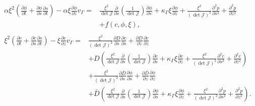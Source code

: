 \begin{subequations}\label{Vnitřní rozvoj: Transformovaná úloha fázového pole}
    \begin{align}
        \begin{split}
            \alpha \xi^2 \left(\frac{\partial \phi}{\partial t} + \frac{\partial \phi}{\partial s}\frac{\partial s}{\partial t}\right) - \alpha\xi \frac{\partial \phi}{\partial z}v_\Gamma =& \frac{\xi^2}{\det \mathcal{J}} \frac{\partial}{\partial s} \left(\frac{1}{\det \mathcal{J}}\right) \frac{\partial \phi}{\partial s} + \kappa_\Gamma\xi \frac{\partial \phi}{\partial z} + \frac{\xi^2}{\left(\det \mathcal{J}\right)^2}\frac{\partial^2 p}{\partial s^2} + \frac{\partial^2 p}{\partial z^2}\\
            & + f(c, \phi, \xi),
        \end{split}\\
        \begin{split}
            \xi^2\left(\frac{\partial c}{\partial t} + \frac{\partial c}{\partial s}\frac{\partial s}{\partial t} \right) - \xi\frac{\partial c}{\partial z}v_\Gamma =& \frac{\xi^2}{(\det \mathcal{J})^2}\frac{\partial D}{\partial s}\frac{\partial c}{\partial s} + \frac{\partial D}{\partial z}\frac{\partial c}{\partial z} \\
            &+ D\left( \frac{\xi^2}{\det \mathcal{J}} \frac{\partial}{\partial s} \left(\frac{1}{\det \mathcal{J}}\right) \frac{\partial c}{\partial s} + \kappa_\Gamma \xi \frac{\partial c}{\partial z} + \frac{\xi^2}{\left(\det \mathcal{J}\right)^2}\frac{\partial^2 c}{\partial s^2} + \frac{\partial^2 c}{\partial z^2} \right)\\
            & + \frac{\xi^2}{(\det \mathcal{J})^2}\frac{\partial \bar D}{\partial s}\frac{\partial \phi}{\partial s} + \frac{\partial \bar D}{\partial z}\frac{\partial \phi}{\partial z} \\
            & + \bar D\left( \frac{\xi^2}{\det \mathcal{J}} \frac{\partial}{\partial s} \left(\frac{1}{\det \mathcal{J}}\right) \frac{\partial \phi}{\partial s} + \kappa_\Gamma \xi \frac{\partial \phi}{\partial z} + \frac{\xi^2}{\left(\det \mathcal{J}\right)^2}\frac{\partial^2 p}{\partial s^2} + \frac{\partial^2 p}{\partial z^2} \right).
        \end{split}
    \end{align}
\end{subequations}

